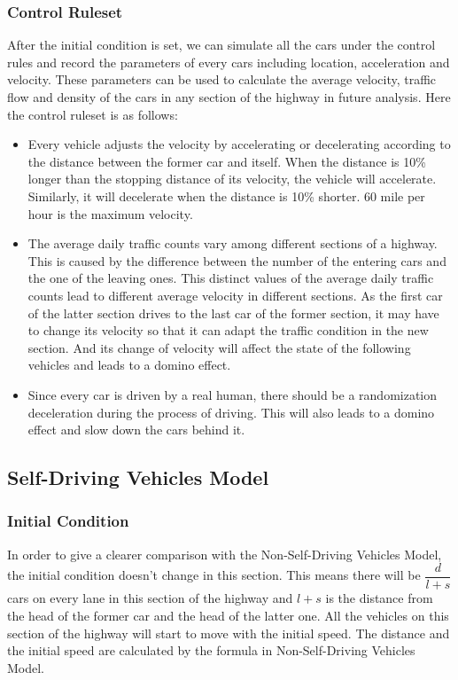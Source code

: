 \documentclass[a4paper]{article}
\begin{document}
	\subsubsection{Control Ruleset}
	After the initial condition is set, we can simulate all the cars under the control rules and record the parameters of every cars including location, acceleration and velocity. These parameters can be used to calculate the average velocity, traffic flow and density of the cars in any section of the highway in future analysis. Here the control ruleset is as follows:
	\begin{itemize}
		\item Every vehicle adjusts the velocity by accelerating or decelerating according to the distance between the former car and itself. When the distance is 10\% longer than the stopping distance of its velocity, the vehicle will accelerate. Similarly, it will decelerate when the distance is 10\% shorter. 60 mile per hour is the maximum velocity.
		\item The average daily traffic counts vary among different sections of a highway. This is caused by the difference between the number of the entering cars and the one of the leaving ones. This distinct values of the average daily traffic counts lead to different average velocity in different sections. As the first car of the latter section drives to the last car of the former section, it may have to change its velocity so that it can adapt the traffic condition in the new section. And its change of velocity will affect the state of the following vehicles and leads to a domino effect.
		\item  Since every car is driven by a real human, there should be a randomization deceleration during the process of driving. This will also leads to a domino effect and slow down the cars behind it.
	\end{itemize}

	\subsection{Self-Driving Vehicles Model}
	\subsubsection{Initial Condition}
	In order to give a clearer comparison with the Non-Self-Driving Vehicles Model, the initial condition doesn't change in this section. This means there will be $ \dfrac{d}{l+s} $ cars on every lane in this section of the highway and $ l+s $ is the distance from the head of the former car and the head of the latter one. All the vehicles on this section of the highway will start to move with the initial speed. The distance and the initial speed are calculated by the formula in Non-Self-Driving Vehicles Model.
\end{document}
